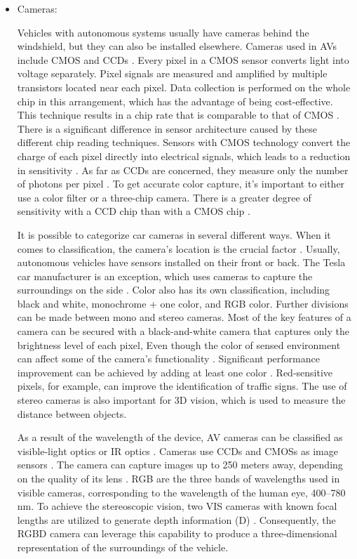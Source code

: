 \documentclass[a4paper,12pt]{article}
\begin{document}
\begin{itemize}
  \item Cameras:

\hspace{5mm} Vehicles with autonomous systems usually have cameras behind the windshield, but they can also be installed elsewhere. Cameras used in AVs include CMOS and CCDs \cite{article26}. Every pixel in a CMOS sensor converts light into voltage separately. Pixel signals are measured and amplified by multiple transistors located near each pixel. Data collection is performed on the whole chip in this arrangement, which has the advantage of being cost-effective. This technique results in a chip rate that is comparable to that of CMOS \cite{article26}. There is a significant difference in sensor architecture caused by these different chip reading techniques. Sensors with CMOS technology convert the charge of each pixel directly into electrical signals, which leads to a reduction in sensitivity \cite{article26}. As far as CCDs are concerned, they measure only the number of photons per pixel \cite{article26}. To get accurate color capture, it's important to either use a color filter or a three-chip camera. There is a greater degree of sensitivity with a CCD chip than with a CMOS chip \cite{article26}.

\hspace{5mm} It is possible to categorize car cameras in several different ways. When it comes to classification, the camera's location is the crucial factor \cite{article26}. Usually, autonomous vehicles have sensors installed on their front or back. The Tesla car manufacturer is an exception, which uses cameras to capture the surroundings on the side \cite{article26}. Color also has its own classification, including black and white, monochrome + one color, and RGB color. Further divisions can be made between mono and stereo cameras. Most of the key features of a camera can be secured with a black-and-white camera that captures only the brightness level of each pixel, Even though the color of sensed environment can affect some of the camera’s functionality \cite{article26}. Significant performance improvement can be achieved by adding at least one color \cite{article26}. Red-sensitive pixels, for example, can improve the identification of traffic signs. The use of stereo cameras is also important for 3D vision, which is used to measure the distance between objects.


\hspace{5mm} As a result of the wavelength of the device, AV cameras can be classified as visible-light optics or IR optics \cite{article24}. Cameras use CCDs and CMOSs as image sensors \cite{article24}. The camera can capture images up to 250 meters away, depending on the quality of its lens \cite{article24}. RGB are the three bands of wavelengths used in visible cameras, corresponding to the wavelength of the human eye, 400–780 nm. To achieve the stereoscopic vision, two VIS cameras with known focal lengths are utilized to generate depth information (D) \cite{article24}. Consequently, the RGBD camera can leverage this capability to produce a three-dimensional representation of the surroundings of the vehicle.



\end{itemize}
\end{document}
